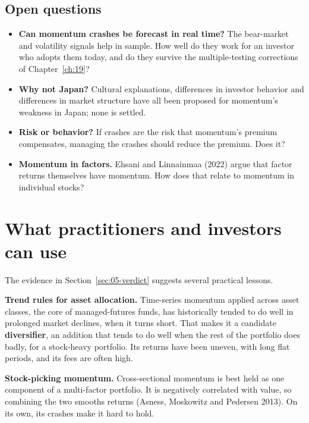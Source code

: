 \subsection{Open questions}
\label{sec:05-open}

\begin{itemize}
  \item \textbf{Can momentum crashes be forecast in real time?} The bear-market and volatility signals help in sample. How well do they work for an investor who adopts them today, and do they survive the multiple-testing corrections of Chapter~\ref{ch:19}?
  \item \textbf{Why not Japan?} Cultural explanations, differences in investor behavior and differences in market structure have all been proposed for momentum's weakness in Japan; none is settled.
  \item \textbf{Risk or behavior?} If crashes are the risk that momentum's premium compensates, managing the crashes should reduce the premium. Does it?
  \item \textbf{Momentum in factors.} Ehsani and Linnainmaa (2022) argue that factor returns themselves have momentum. How does that relate to momentum in individual stocks?
\end{itemize}

\section{What practitioners and investors can use}
\label{sec:05-investors}

The evidence in Section~\ref{sec:05-verdict} suggests several practical lessons.

\textbf{Trend rules for asset allocation.} Time-series momentum applied across asset classes, the core of managed-futures funds, has historically tended to do well in prolonged market declines, when it turns short. That makes it a candidate \textbf{diversifier}, an addition that tends to do well when the rest of the portfolio does badly, for a stock-heavy portfolio. Its returns have been uneven, with long flat periods, and its fees are often high.

\textbf{Stock-picking momentum.} Cross-sectional momentum is best held as one component of a multi-factor portfolio. It is negatively correlated with value, so combining the two smooths returns (Asness, Moskowitz and Pedersen 2013). On its own, its crashes make it hard to hold.

